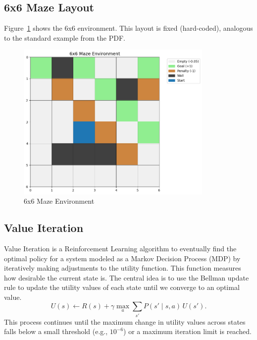 \documentclass[11pt]{article}
\begin{document}
\subsection{6x6 Maze Layout}
Figure~\ref{fig:maze6x6} shows the 6x6 environment. This layout is fixed (hard-coded), analogous to the standard example from the PDF.

\begin{figure}[H]
    \centering
    \includegraphics[width=0.85\textwidth]{maze_6x6_environment.png}
    \caption{6x6 Maze Environment}
    \label{fig:maze6x6}
\end{figure}

\subsection{Value Iteration}
\label{sec:vi_6x6}
Value Iteration is a Reinforcement Learning algorithm to eventually find the optimal policy for a system modeled as a Markov Decision Process (MDP) by iteratively making adjustments to the utility function. This function measures how desirable the current state is. The central idea is to use the Bellman update rule to update the utility values of each state until we converge to an optimal value.
\[
U(s) \leftarrow R(s) + \gamma \max_a \sum_{s'} P(s' \mid s,a)\,U(s').
\]
This process continues until the maximum change in utility values across states falls below a small threshold (e.g., $10^{-6}$) or a maximum iteration limit is reached. 
\end{document}
